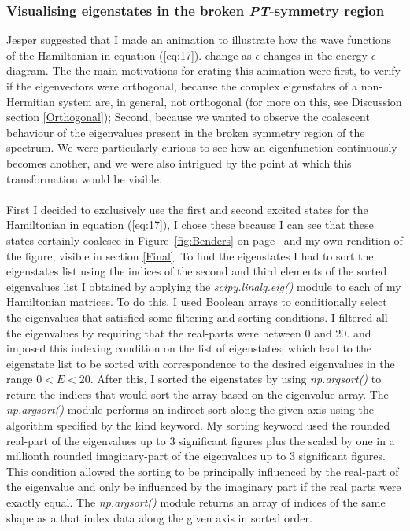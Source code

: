 \documentclass[10pt, a4paper, singlespacing]{report}
\newcommand\PT{\emph{PT}}
\begin{document}
\subsubsection{Visualising eigenstates in the broken \PT-symmetry region}\label{Eigenstates explained}
Jesper suggested that I made an animation to illustrate how the wave functions of the Hamiltonian in equation (\ref{eq:17}). change as $\epsilon$ changes in the energy $\epsilon$ diagram. The the main motivations for crating this animation were first, to verify if the eigenvectors were orthogonal, because the complex eigenstates of a non-Hermitian system are, in general, not orthogonal (for more on this, see Discussion section \ref{Orthogonal}); Second, because we wanted to observe the coalescent behaviour of the eigenvalues present in the broken symmetry region of the spectrum. We were particularly curious to see how an eigenfunction continuously becomes another, and we were also intrigued by the point at which this transformation would be visible.\\\\
First I decided to exclusively use the first and second excited states for the Hamiltonian in equation (\ref{eq:17}), I chose these because I can see that these states certainly coalesce in Figure~\ref{fig:Benders} on page~\pageref{fig:Benders} and my own rendition of the figure, visible in section \ref{Final}.
To find the eigenstates I had to sort the eigenstates list using the indices of the second and third elements of the sorted eigenvalues list I obtained by applying the \emph{scipy.linalg.eig()} module to each of my Hamiltonian matrices. To do this, I used Boolean arrays to conditionally select the eigenvalues that satisfied some filtering and sorting conditions. I filtered all the eigenvalues by requiring that the real-parts were between 0 and 20. and imposed this indexing condition on the list of eigenstates, which lead to the eigenstate list to be sorted with correspondence to the desired eigenvalues in the range $0< E < 20$.
After this, I sorted the eigenstates by using \emph{np.argsort()} to return the indices that would sort the array based on the eigenvalue array. The \emph{np.argsort()} module performs an indirect sort along the given axis using the algorithm specified by the kind keyword. My sorting keyword used the rounded real-part of the eigenvalues up to 3 significant figures plus the scaled by one in a millionth rounded imaginary-part of the eigenvalues up to 3 significant figures. This condition allowed the sorting to be principally influenced by the real-part of the eigenvalue and only be influenced by the imaginary part if the real parts were exactly equal. The \emph{np.argsort()} module returns an array of indices of the same shape as a that index data along the given axis in sorted order\cite{argsort}.\\
\end{document}
